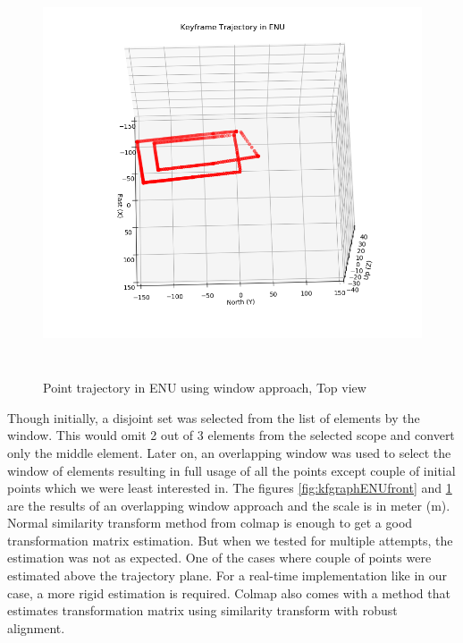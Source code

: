 \begin{figure}[h]
    \centering
    \includegraphics[height=12cm, width=15cm]{Images/KFTrajectoryENUwindowedTop.png}
    \caption{Point trajectory in ENU using window approach, Top view}
    \label{fig:kfgraphENUtop}
\end{figure}

Though initially, a disjoint set was selected from the list of elements by the window. This would omit 2 out of 3 elements from the selected scope and convert only the middle element. Later on, an overlapping window was used to select the window of elements resulting in full usage of all the points except couple of initial points which we were least interested in. The figures \ref{fig:kfgraphENUfront} and \ref{fig:kfgraphENUtop} are the results of an overlapping window approach and the scale is in meter (m).\\

Normal similarity transform method from colmap is enough to get a good transformation matrix estimation. But when we tested for multiple attempts, the estimation was not as expected. One of the cases where couple of points were estimated above the trajectory plane. For a real-time implementation like in our case, a more rigid estimation is required. Colmap also comes with a method that estimates transformation matrix using similarity transform with robust alignment.\\

